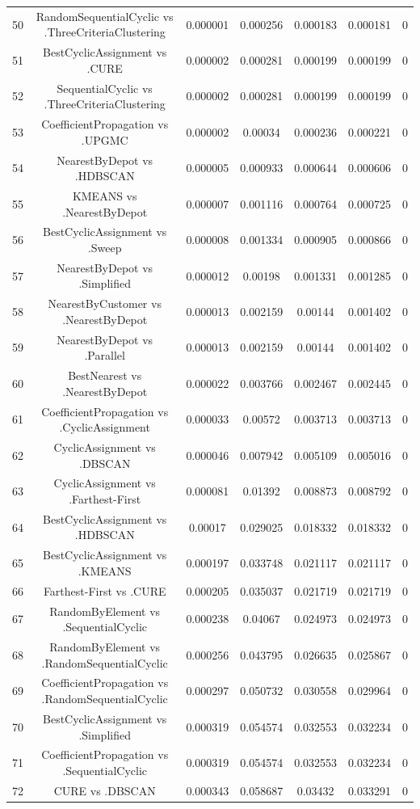 \documentclass[a4paper,10pt]{article}
\begin{document}
\begin{landscape}
\begin{table}[!htp]
\begin{tabular}{ccccccc}
50&RandomSequentialCyclic vs .ThreeCriteriaClustering&0.000001&0.000256&0.000183&0.000181&0\\
51&BestCyclicAssignment vs .CURE&0.000002&0.000281&0.000199&0.000199&0\\
52&SequentialCyclic vs .ThreeCriteriaClustering&0.000002&0.000281&0.000199&0.000199&0\\
53&CoefficientPropagation vs .UPGMC&0.000002&0.00034&0.000236&0.000221&0\\
54&NearestByDepot vs .HDBSCAN&0.000005&0.000933&0.000644&0.000606&0\\
55&KMEANS vs .NearestByDepot&0.000007&0.001116&0.000764&0.000725&0\\
56&BestCyclicAssignment vs .Sweep&0.000008&0.001334&0.000905&0.000866&0\\
57&NearestByDepot vs .Simplified&0.000012&0.00198&0.001331&0.001285&0\\
58&NearestByCustomer vs .NearestByDepot&0.000013&0.002159&0.00144&0.001402&0\\
59&NearestByDepot vs .Parallel&0.000013&0.002159&0.00144&0.001402&0\\
60&BestNearest vs .NearestByDepot&0.000022&0.003766&0.002467&0.002445&0\\
61&CoefficientPropagation vs .CyclicAssignment&0.000033&0.00572&0.003713&0.003713&0\\
62&CyclicAssignment vs .DBSCAN&0.000046&0.007942&0.005109&0.005016&0\\
63&CyclicAssignment vs .Farthest-First&0.000081&0.01392&0.008873&0.008792&0\\
64&BestCyclicAssignment vs .HDBSCAN&0.00017&0.029025&0.018332&0.018332&0\\
65&BestCyclicAssignment vs .KMEANS&0.000197&0.033748&0.021117&0.021117&0\\
66&Farthest-First vs .CURE&0.000205&0.035037&0.021719&0.021719&0\\
67&RandomByElement vs .SequentialCyclic&0.000238&0.04067&0.024973&0.024973&0\\
68&RandomByElement vs .RandomSequentialCyclic&0.000256&0.043795&0.026635&0.025867&0\\
69&CoefficientPropagation vs .RandomSequentialCyclic&0.000297&0.050732&0.030558&0.029964&0\\
70&BestCyclicAssignment vs .Simplified&0.000319&0.054574&0.032553&0.032234&0\\
71&CoefficientPropagation vs .SequentialCyclic&0.000319&0.054574&0.032553&0.032234&0\\
72&CURE vs .DBSCAN&0.000343&0.058687&0.03432&0.033291&0\\

\end{tabular}
\end{table}
\end{landscape}
\end{document}
